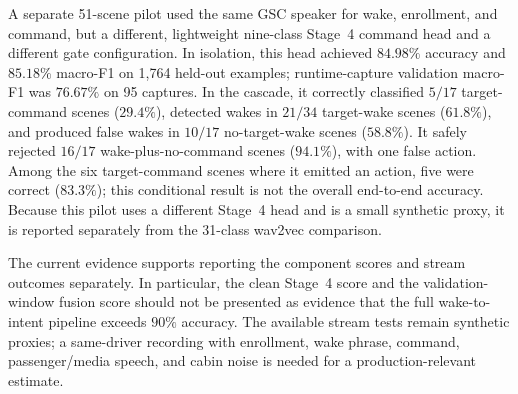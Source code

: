 A separate 51-scene pilot used the same GSC speaker for wake, enrollment, and command, but a different, lightweight nine-class Stage~4 command head and a different gate configuration. In isolation, this head achieved $84.98\%$ accuracy and $85.18\%$ macro-F1 on 1,764 held-out examples; runtime-capture validation macro-F1 was $76.67\%$ on 95 captures. In the cascade, it correctly classified $5/17$ target-command scenes ($29.4\%$), detected wakes in $21/34$ target-wake scenes ($61.8\%$), and produced false wakes in $10/17$ no-target-wake scenes ($58.8\%$). It safely rejected $16/17$ wake-plus-no-command scenes ($94.1\%$), with one false action. Among the six target-command scenes where it emitted an action, five were correct ($83.3\%$); this conditional result is not the overall end-to-end accuracy. Because this pilot uses a different Stage~4 head and is a small synthetic proxy, it is reported separately from the 31-class wav2vec comparison.

The current evidence supports reporting the component scores and stream outcomes separately. In particular, the clean Stage~4 score and the validation-window fusion score should not be presented as evidence that the full wake-to-intent pipeline exceeds $90\%$ accuracy. The available stream tests remain synthetic proxies; a same-driver recording with enrollment, wake phrase, command, passenger/media speech, and cabin noise is needed for a production-relevant estimate.
